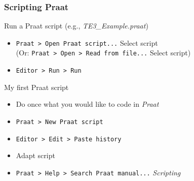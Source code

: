 \documentclass{beamer}
\begin{document}
\begin{frame} 
\frametitle{Scripting Praat} 
\begin{block}{Run a Praat script (e.g., \textit{TE3\_Example.praat})}
\begin{itemize} 
\item \texttt{Praat > Open Praat script...} Select script \\
      (Or: \texttt{Praat > Open > Read from file...} Select script)
\item \texttt{Editor > Run > Run}
\end{itemize}
\end{block} 

\begin{block}{My first Praat script}
\begin{itemize} 
\item Do once what you would like to code in \textit{Praat}
\item \texttt{Praat > New Praat script}
\item \texttt{Editor > Edit > Paste history}
\item Adapt script
\item \texttt{Praat > Help > Search Praat manual...} \textit{Scripting}
\end{itemize}
\end{block} 
\end{frame}
\end{document}

